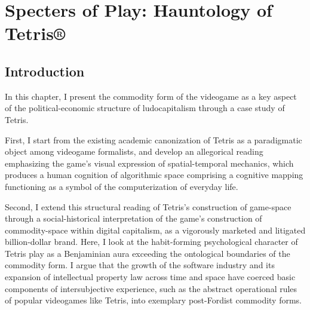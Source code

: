 \chapter{Specters of Play: Hauntology of Tetris®}
\label{tetris}

\section*{Introduction}
In this chapter, I present the commodity form of the videogame as a key aspect of the political-economic structure of ludocapitalism through a case study of Tetris.

First, I start from the existing academic canonization of Tetris as a paradigmatic object among videogame formalists, and develop an allegorical reading emphasizing the game's visual expression of spatial-temporal mechanics, which produces a human cognition of algorithmic space comprising a cognitive mapping functioning as a symbol of the computerization of everyday life.

Second, I extend this structural reading of Tetris's construction of game-space through a social-historical interpretation of the game's construction of commodity-space within digital capitalism, as a vigorously marketed and litigated billion-dollar brand. Here, I look at the habit-forming psychological character of Tetris play as a Benjaminian aura exceeding the ontological boundaries of the commodity form. I argue that the growth of the software industry and its expansion of intellectual property law across time and space have coerced basic components of intersubjective experience, such as the abstract operational rules of popular videogames like Tetris, into exemplary post-Fordist commodity forms.

